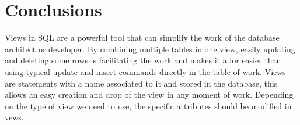 \section*{Conclusions}


Views in SQL are a powerful tool that can simplify the work of the database architect or developer. By combining multiple tables in one view, easily updating and deleting some rows is facilitating the work and makes it a lor easier than using typical update and insert commands directly in the table of work. Views are statements with a name associated to it and stored in the database, this allows an easy creation and drop of the view in any moment of work. Depending on the type of view we need to use, the specific attributes should be modified in vews. 

\clearpage